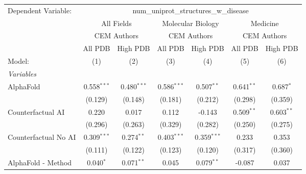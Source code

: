\begingroup
\centering
\begin{tabular}{lcccccc}
   \tabularnewline \midrule \midrule
   Dependent Variable: & \multicolumn{6}{c}{num\_uniprot\_structures\_w\_disease}\\
 & \multicolumn{2}{c}{All Fields} & \multicolumn{2}{c}{Molecular Biology} & \multicolumn{2}{c}{Medicine} \\
\cmidrule(lr){2-3} \cmidrule(lr){4-5} \cmidrule(lr){6-7}
 & \multicolumn{2}{c}{CEM Authors} & \multicolumn{2}{c}{CEM Authors} & \multicolumn{2}{c}{CEM Authors} \\
\cmidrule(lr){2-3} \cmidrule(lr){4-5} \cmidrule(lr){6-7}
 & \multicolumn{1}{c}{All PDB} & \multicolumn{1}{c}{High PDB} & \multicolumn{1}{c}{All PDB} & \multicolumn{1}{c}{High PDB} & \multicolumn{1}{c}{All PDB} & \multicolumn{1}{c}{High PDB} \\
\cmidrule(lr){2-2} \cmidrule(lr){3-3} \cmidrule(lr){4-4} \cmidrule(lr){5-5} \cmidrule(lr){6-6} \cmidrule(lr){7-7}
   Model:                                                     & (1)            & (2)            & (3)            & (4)            & (5)           & (6)\\  
   \midrule
   \emph{Variables}\\
   AlphaFold                                                  & 0.558$^{***}$  & 0.480$^{***}$  & 0.586$^{***}$  & 0.507$^{**}$   & 0.641$^{**}$  & 0.687$^{*}$\\   
                                                              & (0.129)        & (0.148)        & (0.181)        & (0.212)        & (0.298)       & (0.359)\\   
   Counterfactual AI                                          & 0.220          & 0.017          & 0.112          & -0.143         & 0.509$^{**}$  & 0.603$^{**}$\\   
                                                              & (0.296)        & (0.263)        & (0.329)        & (0.282)        & (0.250)       & (0.275)\\   
   Counterfactual No AI                                       & 0.309$^{***}$  & 0.274$^{**}$   & 0.403$^{***}$  & 0.359$^{***}$  & 0.233         & 0.353\\   
                                                              & (0.111)        & (0.122)        & (0.123)        & (0.120)        & (0.317)       & (0.360)\\   
   AlphaFold - Method                                         & 0.040$^{*}$    & 0.071$^{**}$   & 0.045          & 0.079$^{**}$   & -0.087        & 0.037\\   

\end{tabular}
